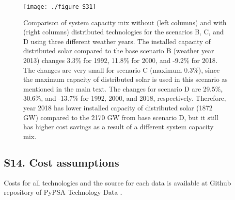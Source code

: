 	\begin{figure}[H]
		\renewcommand*{\thefigure}{S\arabic{figure}}
		\texttt{[image: ./figure S31]}
		\caption{Comparison of system capacity mix without (left columns) and with (right columns) distributed technologies for the scenarios B, C, and D using three different weather years. The installed capacity of distributed solar compared to the base scenario B (weather year 2013) changes 3.3\% for 1992, 11.8\% for 2000, and -9.2\% for 2018. The changes are very small for scenario C (maximum 0.3\%), since the maximum capacity of distributed solar is used in this scenario as mentioned in the main text. The changes for scenario D are 29.5\%, 30.6\%, and -13.7\% for 1992, 2000, and 2018, respectively. Therefore, year 2018 has lower installed capacity of distributed solar (1872 GW) compared to the 2170 GW from base scenario D, but it still has higher cost savings as a result of a different system capacity mix. }
	\end{figure}
	
	
	\subsection*{S14. Cost assumptions}
	Costs for all technologies and the source for each data is available at Github repository of PyPSA Technology Data .

